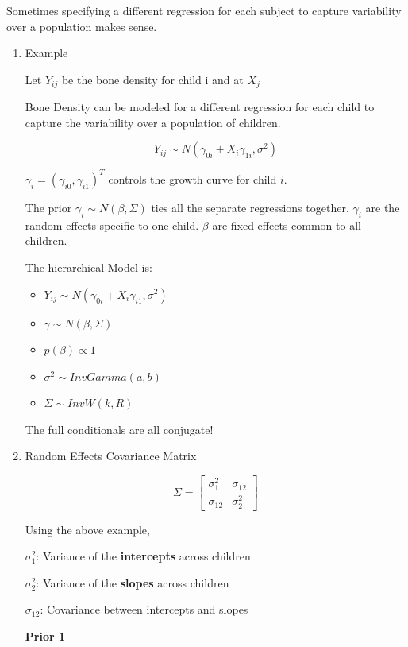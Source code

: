 \documentclass[11pt]{article}
\begin{document}
Sometimes specifying a different regression for each subject to capture
variability over a population makes sense.

\begin{enumerate}
\item Example
\label{sec:org53586e8}

Let \(Y_{ij}\) be the bone density for child i and at \(X_j\)

Bone Density can be modeled for a different regression for each child to capture
the variability over a population of children.

$$
Y_{ij} \sim N(\gamma_{0i} + X_i \gamma_{1i}, \sigma^2)
$$

\(\gamma_{i} = (\gamma_{i0}, \gamma_{i1})^T\) controls the growth curve for child
\(i\).

The prior \(\gamma_i \sim N(\beta, \Sigma)\) ties all the separate regressions
together. \(\gamma_i\) are the random effects specific to one child. \(\beta\) are
fixed effects common to all children.

The hierarchical Model is:

\begin{itemize}
\item \(Y_{ij} \sim N(\gamma_{0i} + X_{i} \gamma_{i 1}, \sigma^2)\)
\item \(\gamma \sim N(\beta, \Sigma)\)
\item \(p(\beta) \propto 1\)
\item \(\sigma^2 \sim InvGamma(a, b)\)
\item \(\Sigma \sim InvW(k, R)\)
\end{itemize}

The full conditionals are all conjugate!

\item Random Effects Covariance Matrix
\label{sec:org59a78dd}

$$
\Sigma = \begin{bmatrix}
\sigma_1^2 & \sigma_{12}\\
\sigma_{12} & \sigma_2^2
\end{bmatrix}
$$

Using the above example,

\(\sigma_1^2\): Variance of the \textbf{intercepts} across children

\(\sigma_2^2\): Variance of the \textbf{slopes} across children

\(\sigma_{12}\): Covariance between intercepts and slopes

\textbf{Prior 1}


\end{enumerate}
\end{document}
